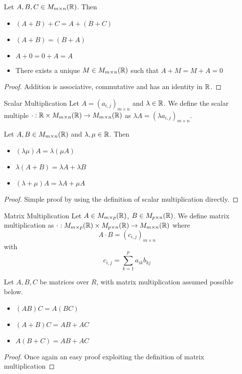 \documentclass[a4paper]{article}
\begin{document}
\begin{prp}{}{} Let $A,B,C\in M_{m\times n}(\mathbb{R})$. Then 
\begin{itemize}
\item $(A+B)+C=A+(B+C)$
\item $(A+B)=(B+A)$
\item $A+0=0+A=A$
\item There exists a unique $M\in M_{m\times n}(\mathbb{R})$ such that $A+M=M+A=0$
\end{itemize}
\end{prp}
\begin{proof} Addition is associative, commutative and has an identity in $\mathbb{R}$. 
\end{proof}

\begin{defn}{Scalar Multiplication}{} Let $A=(a_{i,j})_{m\times n}$ and $\lambda\in\mathbb{R}$. We define the scalar multiple $\cdot:\mathbb{R}\times M_{m\times n}(\mathbb{R})\to M_{m\times n}(\mathbb{R})$ as $\lambda A=(\lambda a_{i,j})_{m\times n}$. 
\end{defn}

\begin{prp}{}{} Let $A,B\in M_{m\times n}(\mathbb{R})$ and $\lambda,\mu\in\mathbb{R}$. Then
\begin{itemize}
\item $(\lambda\mu)A=\lambda(\mu A)$
\item $\lambda(A+B)=\lambda A+\lambda B$
\item $(\lambda+\mu)A=\lambda A+\mu A$
\end{itemize}
\end{prp}
\begin{proof} Simple proof by using the definition of scalar multiplication directly. 
\end{proof}

\begin{defn}{Matrix Multiplication}{} Let $A\in M_{m\times p}(\mathbb{R})$, $B\in M_{p\times n}(\mathbb{R})$. We define matrix multiplication as $\cdot:M_{m\times p}(\mathbb{R})\times M_{p\times n}(\mathbb{R})\to M_{m\times n}(\mathbb{R})$ where $$A\cdot B=(c_{i,j})_{m\times n}$$ with $$c_{i,j}=\sum_{k=1}^pa_{ik}b_{kj}$$
\end{defn}

\begin{prp}{}{} Let $A,B,C$ be matrices over $R$, with matrix multiplication assumed possible below. 
\begin{itemize}
\item $(AB)C=A(BC)$
\item $(A+B)C=AB+AC$
\item $A(B+C)=AB+AC$
\end{itemize}\tcbline
\begin{proof} Once again an easy proof exploiting the definition of matrix multiplication
\end{proof}
\end{prp}
\end{document}
